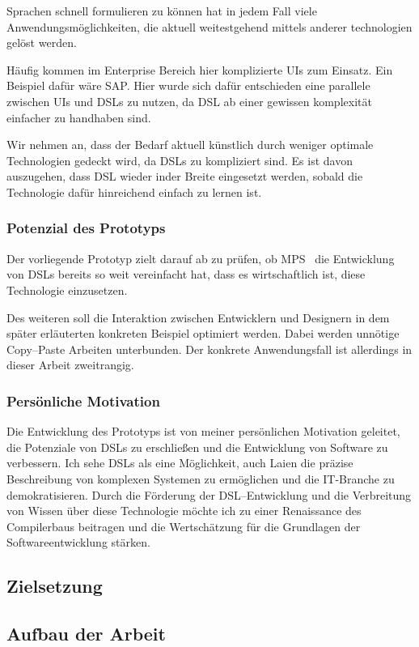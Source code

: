 Sprachen schnell formulieren zu können hat in jedem Fall viele Anwendungsmöglichkeiten, die aktuell weitestgehend mittels anderer technologien gelöst werden.

Häufig kommen im Enterprise Bereich hier komplizierte \acp{UI} zum Einsatz.
Ein Beispiel dafür wäre SAP\@. %
Hier wurde sich dafür entschieden eine parallele zwischen \acp{UI} und \acp{DSL} zu nutzen, da \ac{DSL} ab einer gewissen komplexität einfacher zu handhaben sind.

Wir nehmen an, dass der Bedarf aktuell künstlich durch weniger optimale Technologien gedeckt wird, da \acp{DSL} zu kompliziert sind.
Es ist davon auszugehen, dass \ac{DSL} wieder inder Breite eingesetzt werden, sobald die Technologie dafür hinreichend einfach zu lernen ist.

\subsubsection{Potenzial des Prototyps}
Der vorliegende Prototyp zielt darauf ab zu prüfen, ob \ac{MPS}~\autocite{jetbrains-sro-2021} die Entwicklung von \acp{DSL} bereits so weit vereinfacht hat, dass es wirtschaftlich ist, diese Technologie einzusetzen.

Des weiteren soll die Interaktion zwischen Entwicklern und Designern in dem später erläuterten konkreten Beispiel optimiert werden.
Dabei werden unnötige Copy--Paste Arbeiten unterbunden.
Der konkrete Anwendungsfall ist allerdings in dieser Arbeit zweitrangig.

\subsubsection{Persönliche Motivation}
Die Entwicklung des Prototyps ist von meiner persönlichen Motivation geleitet, die Potenziale von \acp{DSL} zu erschließen und die Entwicklung von Software zu verbessern.
Ich sehe \acp{DSL} als eine Möglichkeit, auch Laien die präzise Beschreibung von komplexen Systemen zu ermöglichen und die IT-Branche zu demokratisieren.
Durch die Förderung der \ac{DSL}--Entwicklung und die Verbreitung von Wissen über diese Technologie möchte ich zu einer Renaissance des Compilerbaus beitragen und die Wertschätzung für die Grundlagen der Softwareentwicklung stärken.

\subsection{Zielsetzung}\label{subsec:zielsetzung}
\lipsum[5]

\subsection{Aufbau der Arbeit}\label{subsec:aufbau-der-arbeit}
\lipsum[5]
